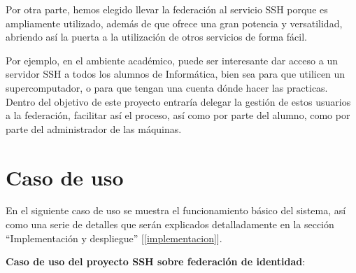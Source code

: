 Por otra parte, hemos elegido llevar la federación al servicio SSH
porque es ampliamente utilizado, además de que ofrece una gran
potencia y versatilidad, abriendo así la puerta a la utilización de
otros servicios de forma fácil.

Por ejemplo, en el ambiente académico, puede ser interesante dar
acceso a un servidor SSH a todos los alumnos de Informática, bien sea
para que utilicen un supercomputador, o para que tengan una cuenta
dónde hacer las practicas. Dentro del objetivo de este proyecto
entraría delegar la gestión de estos usuarios a la federación,
facilitar así el proceso, así como por parte del alumno, como por
parte del administrador de las máquinas.
\newpage
\section{Caso de uso}

    En el siguiente caso de uso se muestra el funcionamiento básico del
    sistema, así como una serie de detalles que serán explicados
    detalladamente en la sección ``Implementación y despliegue''
    [\ref{implementacion}].

    \textbf{Caso de uso del proyecto SSH sobre federación de identidad}:

